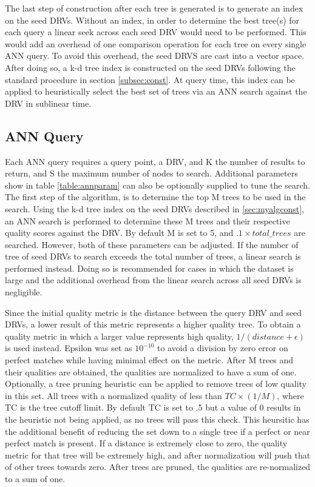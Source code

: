 The last step of construction after each tree is generated is to generate an index on the seed DRVs.  Without an index, in order to determine the best tree(s) for each query a linear seek across each seed DRV would need to be performed.  This would add an overhead of one comparison operation for each tree on every single ANN query.  To avoid this overhead, the seed DRVS are cast into a vector space.  After doing so, a k-d tree index is constructed on the seed DRVs following the standard procedure in section \ref{subsec:const}.  At query time, this index can be applied to heuristically select the best set of trees via an ANN search against the DRV in sublinear time.

\subsection{ANN Query}

Each ANN query requires a query point, a DRV, and K the number of results to return, and S the maximum number of nodes to search.  Additional parameters show in table \ref{table:annparam} can also be optionally supplied to tune the search.  The first step of the algorithm, is to determine the top M trees to be used in the search.  Using the k-d tree index on the seed DRVs described in \ref{sec:myalgconst}, an ANN search is performed to determine these M trees and their respective quality scores against the DRV.  By default M is set to 5, and $.1 \times {total\_trees}$ are searched.  However, both of these parameters can be adjusted.  If the number of tree of seed DRVs to search exceeds the total number of trees, a linear search is performed instead.  Doing so is recommended for cases in which the dataset is large and the additional overhead from the linear search across all seed DRVs is negligible.

Since the initial quality metric is the distance between the query DRV and seed DRVs, a lower result of this metric represents a higher quality tree.  To obtain a quality metric in which a larger value represents high quality, $1/(distance + \epsilon)$ is used instead.  Epsilon was set as $10^{-10}$ to avoid a division by zero error on perfect matches while having minimal effect on the metric.  After M trees and their qualities are obtained, the qualities are normalized to have a sum of one.  Optionally, a tree pruning heuristic can be applied to remove trees of low quality in this set.  All trees with a normalized quality of less than $TC\times(1/M)$, where TC is the tree cutoff limit.  By default TC is set to .5 but a value of 0 results in the heuristic not being applied, as no trees will pass this check.  This heursitic has the additional benefit of reducing the set down to a single tree if a perfect or near perfect match is present.  If a distance is extremely close to zero, the quality metric for that tree will be extremely high, and after normalization will push that of other trees towards zero.  After trees are pruned, the qualities are re-normalized to a sum of one.


